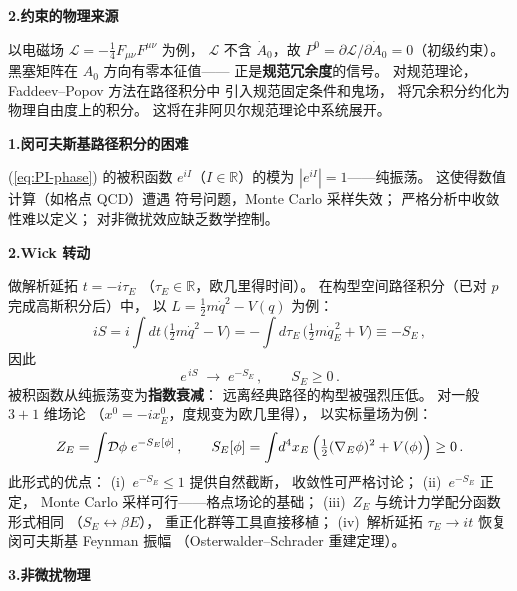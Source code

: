 \medskip\noindent
\textbf{2.\;约束的物理来源}

\medskip\noindent
以电磁场
$\mathcal{L}=-\frac{1}{4}F_{\mu\nu}F^{\mu\nu}$ 为例，
$\mathcal{L}$ 不含 $\dot{A}_0$，故
$P^0=\partial\mathcal{L}/\partial\dot{A}_0=0$（初级约束）。
黑塞矩阵在 $A_0$ 方向有零本征值——
正是\textbf{规范冗余度}的信号。
对规范理论，Faddeev--Popov 方法在路径积分中
引入规范固定条件和鬼场，
将冗余积分约化为物理自由度上的积分。
这将在非阿贝尔规范理论中系统展开。




\noindent
\textbf{1.\;闵可夫斯基路径积分的困难}

\medskip\noindent
(\ref{eq:PI-phase}) 的被积函数
$e^{iI}$（$I\in\mathbb{R}$）的模为
$|e^{iI}|=1$——纯振荡。
这使得数值计算（如格点 QCD）遭遇
符号问题，Monte Carlo 采样失效；
严格分析中收敛性难以定义；
对非微扰效应缺乏数学控制。

\medskip\noindent
\textbf{2.\;Wick 转动}

\medskip\noindent
做解析延拓 $t=-i\tau_E$
（$\tau_E\in\mathbb{R}$，欧几里得时间）。
在构型空间路径积分（已对 $p$ 完成高斯积分后）中，
以 $L=\frac{1}{2}m\dot{q}^2-V(q)$ 为例：
\[
  iS = i\!\int\!dt\,
    \bigl(\tfrac{1}{2}m\dot{q}^2-V\bigr)
  = -\!\int\!d\tau_E\,
    \bigl(\tfrac{1}{2}m\dot{q}_E^{\,2}+V\bigr)
  \equiv -S_E\,,
\]
因此
\begin{equation}\label{eq:Wick}
  e^{\,iS}\;\longrightarrow\;e^{-S_E}\,,\qquad
  S_E\geq 0\,.
\end{equation}
被积函数从纯振荡变为\textbf{指数衰减}：
远离经典路径的构型被强烈压低。
对一般 $3{+}1$ 维场论
（$x^0=-ix^0_E$，度规变为欧几里得），
以实标量场为例：
\begin{equation}\label{eq:ZE}
  Z_E=\int\!\mathcal{D}\phi\;e^{-S_E[\phi]}\,,\qquad
  S_E[\phi]=\int\!d^4x_E\,
    \Bigl(\tfrac{1}{2}(\nabla_E\phi)^2+V(\phi)\Bigr)
    \geq 0\,.
\end{equation}
此形式的优点：
(i)~$e^{-S_E}\leq 1$ 提供自然截断，
收敛性可严格讨论；
(ii)~$e^{-S_E}$ 正定，
Monte Carlo 采样可行——格点场论的基础；
(iii)~$Z_E$ 与统计力学配分函数形式相同
（$S_E\leftrightarrow\beta E$），
重正化群等工具直接移植；
(iv)~解析延拓 $\tau_E\to it$
恢复闵可夫斯基 Feynman 振幅
（Osterwalder--Schrader 重建定理）。

\medskip\noindent
\textbf{3.\;非微扰物理}

